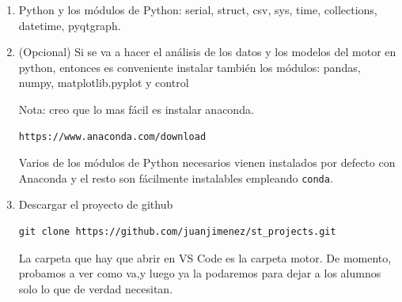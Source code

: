 \documentclass[10pt,a4paper]{report}
\begin{document}
\begin{enumerate}
El resto de las herramientas, se pueden instalar directamente a través de Visualstudio Code Mediante las extensiones para SMT32,(barra lateral izquierda, icono de los cuadrados). Para ello hay que abrir VSCode y buscar las extensiones de STM32CUBE. El símbolo es una mariposa. Es importante emplear las oficiales. 

\item Python y los módulos de Python: serial, struct, csv, sys, time, collections, datetime, pyqtgraph.
\item (Opcional) Si se va a hacer el análisis de los datos y los modelos del motor en python, entonces es conveniente instalar también los módulos: pandas, numpy, matplotlib.pyplot y control

Nota: creo que lo mas fácil es instalar anaconda.
\begin{verbatim}
https://www.anaconda.com/download
\end{verbatim}

Varios de los módulos de Python necesarios vienen instalados por defecto con Anaconda y el resto son fácilmente instalables empleando \texttt{conda}.

\item Descargar el proyecto de github
\begin{verbatim}
git clone https://github.com/juanjimenez/st_projects.git
\end{verbatim}
La carpeta que hay que abrir en VS Code es la carpeta motor. 
De momento, probamos a ver como va,y luego ya la podaremos para dejar a los alumnos solo lo que de verdad necesitan.
\end{enumerate}
\end{document}
